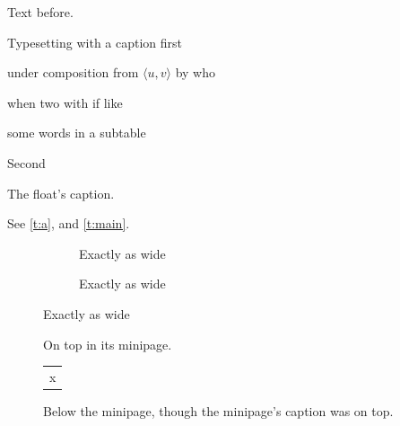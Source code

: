 \documentclass{article}
\begin{document}
Text before.
\begin{table}[h]
\centering
\vspace{20pt}
\begin{subtable}[c]{6em}
\caption{Typesetting with a caption first}\label{t:a}
\centering
under composition from \(\langle u, v\rangle\) by who

when two with if like
\end{subtable}\quad
\begin{subtable}{0.4\textwidth}
some words in a subtable
\caption{Second}\label{t:b}
\end{subtable}
\caption{The float's caption.}\label{t:main}
\end{table}
See \ref{t:a},  and \ref{t:main}.
\begin{figure}[h]
\centering
\begin{subfigure}{5164702sp}
\caption{Exactly as wide}
\end{subfigure}
\begin{subfigure}{5164701sp}
\caption{Exactly as wide}
\end{subfigure}
\end{figure}
\begin{figure}[h]
\begin{minipage}{4cm}
\caption{On top in its minipage.}
\begin{tabular}{c}x\end{tabular}
\end{minipage}
\caption{Below the minipage, though the minipage's caption was on top.}
\end{figure}
\end{document}
